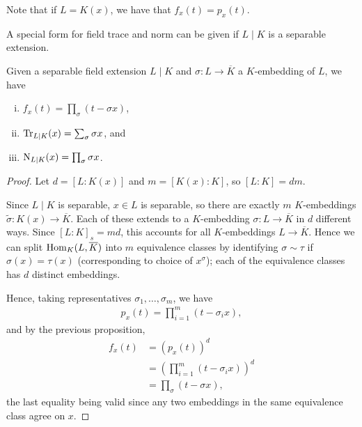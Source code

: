 Note that if $L=K(x)$, we have that $f_x(t)=p_x(t)$.


A special form for field trace and norm can be given if $L\mid K$ is a separable extension.

\begin{prop}[Neukirch 2.6]
	Given a separable field extension $L\mid K$ and $\sigma : L\to\overline{K}$ a $K$-embedding of $L$, we have
	\begin{enumerate}[(i)]
		\item $f_x(t)= \prod_\sigma(t-\sigma x)$,
		\item $\operatorname{Tr}_{L\mid K}(x) = \sum_\sigma \sigma x$, and
		\item $\operatorname{N}_{L\mid K}(x) = \prod_\sigma \sigma x$.
	\end{enumerate}
\end{prop}
\begin{proof}
	Let $d=[L:K(x)]$ and $m=[K(x):K]$, so $[L:K]=dm$.

	Since $L\mid K$ is separable, $x\in L$ is separable, so there are exactly $m$ $K$-embeddings $\tilde{\sigma}:K(x)\to \overline{K}$. Each of these extends to a $K$-embedding $\sigma: L\to \overline{K}$ in $d$ different ways. Since $[L:K]_s=md$, this accounts for all $K$-embeddings $L\to\overline{K}$. Hence we can split $\text{Hom}_K(L,\overline{K})$ into $m$ equivalence classes by identifying $\sigma \sim \tau$ if $\sigma(x)=\tau(x)$ (corresponding to choice of $x^\sigma$); each of the equivalence classes has $d$ distinct embeddings.


	Hence, taking representatives $\sigma_1,\dots,\sigma_m$, we have
	\begin{align*}
		p_x(t) = \prod_{i=1}^m (t- \sigma_i x),
	\end{align*}
	and by the previous proposition,
	\begin{align*}
		f_x(t) &= \left( p_x(t)\right)^d\\
			&= \left(\prod_{i=1}^m (t-\sigma_i x)\right)^d\\
			&= \prod_\sigma (t-\sigma x),
	\end{align*}
	the last equality being valid since any two embeddings in the same equivalence class agree on $x$.


\end{proof}
